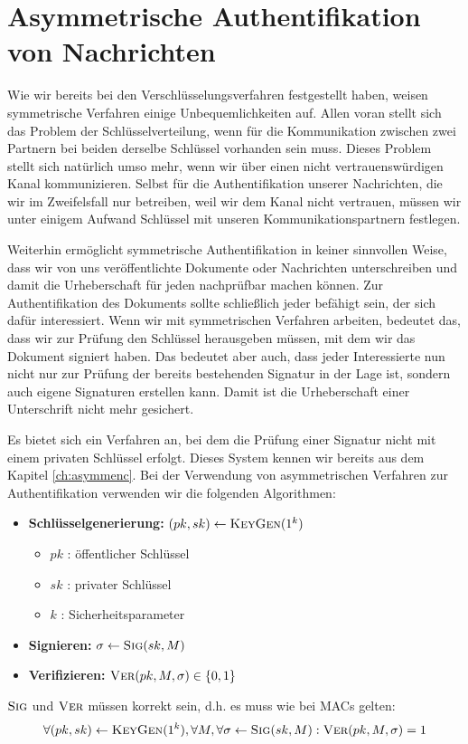 \chapter{Asymmetrische Authentifikation von
  Nachrichten}\indexMessageAuthAsymm
\label{cha:asymmauth}

Wie wir bereits bei den Verschlüsselungsverfahren festgestellt haben,
weisen symmetrische Verfahren einige Unbequemlichkeiten auf. Allen voran
stellt sich das Problem der Schlüsselverteilung, wenn für die
Kommunikation zwischen zwei Partnern bei beiden derselbe Schlüssel
vorhanden sein muss. Dieses Problem stellt sich natürlich umso mehr,
wenn wir über einen nicht vertrauenswürdigen Kanal kommunizieren. Selbst
für die Authentifikation unserer Nachrichten, die wir im Zweifelsfall
nur betreiben, weil wir dem Kanal nicht vertrauen, müssen wir unter
einigem Aufwand Schlüssel mit unseren Kommunikationspartnern festlegen.

Weiterhin ermöglicht symmetrische Authentifikation in keiner sinnvollen
Weise, dass wir von uns veröffentlichte Dokumente oder Nachrichten
unterschreiben und damit die Urheberschaft für jeden nachprüfbar machen
können. Zur Authentifikation des Dokuments sollte schließlich jeder
befähigt sein, der sich dafür interessiert. Wenn wir mit symmetrischen
Verfahren arbeiten, bedeutet das, dass wir zur Prüfung den Schlüssel
herausgeben müssen, mit dem wir das Dokument signiert haben. Das
bedeutet aber auch, dass jeder Interessierte nun nicht nur zur Prüfung
der bereits bestehenden Signatur in der Lage ist, sondern auch eigene
Signaturen erstellen kann. Damit ist die Urheberschaft einer
Unterschrift nicht mehr gesichert.

Es bietet sich ein Verfahren an, bei dem die Prüfung einer Signatur
nicht mit einem privaten Schlüssel erfolgt. Dieses System kennen wir
bereits aus dem Kapitel \ref{ch:asymmenc}. Bei der Verwendung von
asymmetrischen Verfahren zur Authentifikation verwenden wir die
folgenden Algorithmen:
\begin{itemize}
\item \textbf{Schlüsselgenerierung:} $(pk, sk) \leftarrow
  \textsc{KeyGen}(1^k)$
  \begin{itemize}
  \item $pk$ : öffentlicher Schlüssel
  \item $sk$ : privater Schlüssel
  \item $k$ : Sicherheitsparameter
  \end{itemize}
\item \textbf{Signieren:} $\sigma \leftarrow \textsc{Sig}(sk,M)$
\item \textbf{Verifizieren:} $\textsc{Ver}(pk,M,\sigma) \in \{ 0,1 \}$
\end{itemize} $\textsc{Sig}$ und $\textsc{Ver}$ müssen korrekt sein, d.h. es muss wie
bei MACs gelten:
\begin{equation*} \forall (pk,sk) \leftarrow \textsc{KeyGen}(1^k), \forall M,
  \forall \sigma \leftarrow \textsc{Sig}(sk,M) : \textsc{Ver}(pk,M,\sigma) = 1
\end{equation*}
